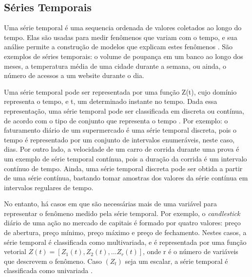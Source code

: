 \subsection{Séries Temporais}
	\label{subsec:series_temporais}

Uma série temporal é uma sequencia ordenada de valores coletados ao longo do
tempo. Elas são usadas para medir fenômenos que variam com o tempo, e sua
análise permite a construção de modelos que explicam estes fenômenos
\cite{morettin2006analise}. São exemplos de séries temporais: o volume de
poupança em um banco ao longo dos meses, a temperatura média de uma cidade
durante a semana, ou ainda, o número de acessos a um website durante o dia.

Uma série temporal pode ser representada por uma função Z(t), cujo domínio
representa o tempo, e t, um determinado instante no tempo. Dada essa
representação, uma série temporal pode ser classificada em discreta ou contínua,
de acordo com o tipo de conjunto que representa o tempo
\cite{morettin2006analise}. Por exemplo: o faturamento diário de um supermercado
é uma série temporal discreta, pois o tempo é representado por um conjunto de
intervalos enumeráveis, neste caso, dias. Por outro lado, a velocidade de um
carro de corrida durante uma prova é um exemplo de série temporal contínua, pois
a duração da corrida é um intervalo contínuo de tempo. Ainda, uma série temporal
discreta pode ser obtida a partir de uma série contínua, bastando tomar amostras
dos valores da série contínua em intervalos regulares de tempo.

No entanto, há casos em que são necessárias mais de uma variável para
representar o fenômeno medido pela série temporal. Por exemplo, o
\emph{candlestick} diário de uma ação no mercado de capitais é formado por
quatro valores: preço de abertura, preço mínimo, preço máximo e preço de
fechamento. Nestes casos, a série temporal é classificada como multivariada, e é
representada por uma função vetorial
$Z\left(t\right) =
	\left[
		Z_1\left(t\right),
		Z_2\left(t\right),
		...
		Z_r\left(t\right)
	\right]$,
onde r é o número de variáveis que descrevem o fenômeno. Caso $\left(Z_t\right)$
seja um escalar, a série temporal é classificada como univariada
\cite{morettin2006analise}.